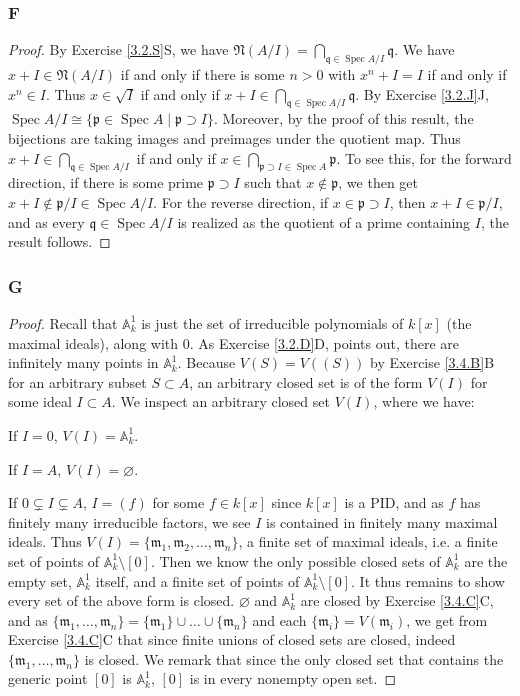 \documentclass{article}
\newcommand{\A}{\mathbb{A}}
\newcommand{\frkm}{\mathfrak{m}}
\newcommand{\frkp}{\mathfrak{p}}
\newcommand{\frkq}{\mathfrak{q}}
\newcommand{\frkN}{\mathfrak{N}}
\DeclareMathOperator{\Spec}{\mathrm{Spec}}
\let\emptyset\varnothing
\theoremstyle{definition} %
\begin{document}
\subsubsection{F}\label{3.4.F}
\begin{proof}
    By Exercise \ref{3.2.S}S, we have $\frkN(A/I)=\bigcap_{\frkq \in \Spec A/I} \frkq$. We have $x+I \in \frkN(A/I)$ if and only if there is some $n>0$ with $x^n +I=I$ if and only if $x^n \in I$. Thus $x\in \sqrt I$ if and only if $x+I \in \bigcap_{\frkq \in \Spec A/I} \frkq$. By Exercise \ref{3.2.J}J, $\Spec A/I \cong \{ \frkp \in \Spec A \mid \frkp \supset I\}$. Moreover, by the proof of this result, the bijections are taking images and preimages under the quotient map. Thus $x+I \in \bigcap_{\frkq \in \Spec A/I}$ if and only if $x\in \bigcap_{\frkp \supset I \in \Spec A} \frkp$. To see this, for the forward direction, if there is some prime $\frkp \supset I$ such that $x\notin \frkp$, we then get $x+I\notin \frkp/I\in \Spec A/I$. For the reverse direction, if $x\in \frkp \supset I$, then $x+I \in \frkp/I$, and as every $\frkq \in \Spec A/I$ is realized as the quotient of a prime containing $I$, the result follows.
\end{proof}
\subsubsection{G}\label{3.4.G}
\begin{proof}
    Recall that $\A^1_k$ is just the set of irreducible polynomials of $k[x]$ (the maximal ideals), along with $0$. As Exercise \ref{3.2.D}D, points out, there are infinitely many points in $\A^1_k$. Because $V(S)=V((S))$ by Exercise \ref{3.4.B}B for an arbitrary subset $S\subset A$, an arbitrary closed set is of the form $V(I)$ for some ideal $I\subset A$.
    We inspect an arbitrary closed set $V(I)$, where we have:

    If $I=0$, $V(I)=\A^1_k$.

    If $I=A$, $V(I)=\emptyset$.

    If $0\subsetneq I \subsetneq A$,  $I=(f)$ for some $f\in k[x]$ since $k[x]$ is a PID, and as $f$ has finitely many irreducible factors, we see $I$ is contained in finitely many maximal ideals. Thus $V(I)=\{\frkm_1,\frkm_2,\dots,\frkm_n\}$, a finite set of maximal ideals, i.e. a finite set of points of $\A^1_k\setminus [0]$. Then we know the only possible closed sets of $\A^1_k$ are the empty set, $\A^1_k$ itself, and a finite set of points of $\A^1_k \setminus [0]$. It thus remains to show every set of the above form is closed. $\emptyset$ and $\A^1_k$ are closed by Exercise \ref{3.4.C}C, and as $\{\frkm_1,\dots,\frkm_n\}=\{\frkm_1\}\cup \dots \cup \{\frkm_n\}$ and each $\{\frkm_i\} = V(\frkm_i)$, we get from Exercise \ref{3.4.C}C that since finite unions of closed sets are closed, indeed $\{\frkm_1,\dots,\frkm_n\}$ is closed. We remark that since the only closed set that contains the generic point $[0]$ is $\A^1_k$, $[0]$ is in every nonempty open set.
\end{proof}
\end{document}
